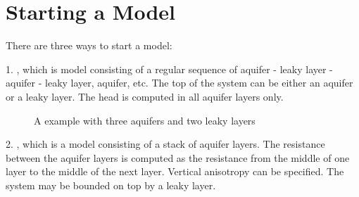 \documentclass[letterpaper,10pt,english]{sphinxmanual}
\begin{document}
\section{Starting a Model}
\label{\detokenize{models/modelindex:starting-a-model}}\label{\detokenize{models/modelindex::doc}}
There are three ways to start a model:

1. {\hyperref[\detokenize{models/modelmaq:timml.model.ModelMaq}]{}}, which is model consisting of a regular sequence of aquifer - leaky layer - aquifer - leaky layer, aquifer, etc.
The top of the system can be either an aquifer or a leaky layer. The head is computed in all aquifer layers only.

\begin{sphinxVerbatim}[commandchars=\\\{\}]
  \PYG{p}{[}  \PYG{p}{]} \PYG{p}{[}     \PYG{p}{]} \PYG{p}{[} \PYG{p}{]}
\end{sphinxVerbatim}
\begin{figure}[htbp]
\centering
\capstart

\noindent{}
\caption{A  example with three aquifers and two leaky layers}\label{\detokenize{models/modelindex:id1}}\end{figure}

2. {\hyperref[\detokenize{models/model3d:timml.model.Model3D}]{}}, which is a model consisting of a stack of aquifer layers. The resistance between the aquifer layers is computed
as the resistance from the middle of one layer to the middle of the next layer. Vertical anisotropy can be specified. The system
may be bounded on top by a leaky layer.
\end{document}
